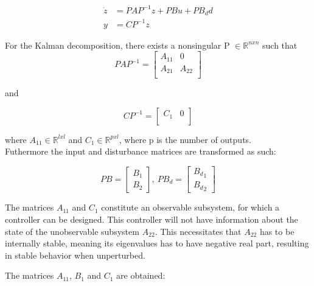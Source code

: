 \begin{equation}
	\begin{split}
		\dot{z} & = PAP^{-1}z + PBu + PB_dd \\
		y & = CP^{-1}z
	\end{split}
\end{equation}

For the Kalman decomposition, there exists a nonsingular P  $\in \mathbb{R} ^{n x n}$ such that
\begin{equation}
	PAP^{-1} = \begin{bmatrix}
		A_{11}       & 0 \\
		A_{21}       & A_{22} \\
	\end{bmatrix}
\end{equation}

and

\begin{equation}
	CP^{-1} = \begin{bmatrix}
		C_{1}       & 0 \\
	\end{bmatrix}
\end{equation}

where $A_{11} \in \mathbb{R} ^{l x l}$ and $C_{1} \in \mathbb{R} ^{p x l}$, where p is the number of outputs.\\Futhermore the input and disturbance matrices are transformed as such:

\begin{equation}
	PB = \begin{bmatrix}
		B_1 \\
		B_2
	\end{bmatrix}, \
	PB_d = \begin{bmatrix}
		{B_d}_1 \\
		{B_d}_2
	\end{bmatrix}
\end{equation}


The matrices $A_{11}$ and $C_{1}$ constitute an observable subsystem, for which a controller can be designed. This controller will not have information about the state of the unobservable subsystem $A_{22}$. This necessitates that $A_{22}$ has to be internally stable, meaning its eigenvalues has to have negative real part, resulting in stable behavior when unperturbed.

The matrices $A_{11}$, $B_{1}$ and $C_{1}$ are obtained:

